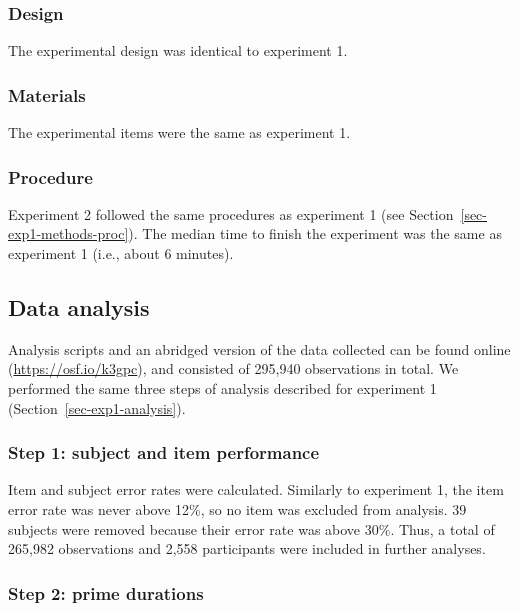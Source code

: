 \documentclass[
]{interact}
\begin{document}
\subsubsection{Design}\label{sec-exp2-methods-design}

The experimental design was identical to experiment 1.

\subsubsection{Materials}\label{sec-exp2-methods-materials}

The experimental items were the same as experiment 1.

\subsubsection{Procedure}\label{sec-exp2-methods-proc}

Experiment 2 followed the same procedures as experiment 1 (see
Section~\ref{sec-exp1-methods-proc}). The median time to finish the
experiment was the same as experiment 1 (i.e., about 6 minutes).

\subsection{Data analysis}\label{sec-exp2-analysis}

Analysis scripts and an abridged version of the data collected can be
found online (\url{https://osf.io/k3gpc}), and consisted of 295,940
observations in total. We performed the same three steps of analysis
described for experiment 1 (Section~\ref{sec-exp1-analysis}).

\subsubsection{Step 1: subject and item
performance}\label{sec-exp2-analysis-performance}

Item and subject error rates were calculated. Similarly to experiment 1,
the item error rate was never above 12\%, so no item was excluded from
analysis. 39 subjects were removed because their error rate was above
30\%. Thus, a total of 265,982 observations and 2,558 participants were
included in further analyses.

\subsubsection{Step 2: prime
durations}\label{sec-exp2-analysis-primeTime}
\end{document}
